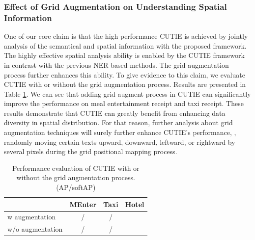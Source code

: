 \documentclass[10pt,twocolumn,letterpaper]{article}
\begin{document}
\subsubsection{Effect of Grid Augmentation on Understanding Spatial Information}
One of our core claim is that the high performance CUTIE is achieved by jointly analysis of the semantical and spatial information with the proposed framework. The highly effective spatial analysis ability is enabled by the CUTIE framework in contrast with the previous NER based methods. The grid augmentation process further enhances this ability. To give evidence to this claim, we evaluate CUTIE with or without the grid augmentation process. Results are presented in Table \ref{tab:augmentation}. We can see that adding grid augment process in CUTIE can significantly improve the performance on meal entertainment receipt and taxi receipt. These results demonstrate that CUTIE can greatly benefit from enhancing data diversity in spatial distribution. For that reason, further analysis about grid augmentation techniques will surely further enhance CUTIE's performance, \eg, randomly moving certain texts upward, downward, leftward, or rightward by several pixels during the grid positional mapping process. 
\begin{table}
	\caption{Performance evaluation of CUTIE with or without the grid augmentation process. (AP/softAP)}
\begin{center}
\begin{tabular}{l | c | c | c}
	 & MEnter & Taxi & Hotel \\
	\hline
	w augmentation & / & / & \\
	w/o augmentation & / & / & \\
\end{tabular}
\end{center}
	\label{tab:augmentation}
\end{table}
\end{document}
